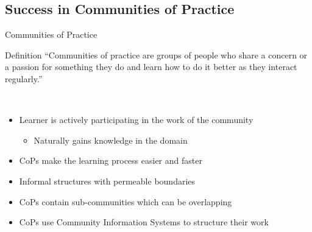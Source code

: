\subsection{Success in Communities of Practice}

\begin{frame}{Communities of Practice}
  \begin{block}{Definition}
    ``Communities of practice are groups of people who share a concern or a
    passion for something they do and learn how to do it better as they interact regularly.'' \cite{Weng98}
  \end{block}
  \ \\
  \begin{itemize}
    \item Learner is actively participating in the work of the community
    \begin{itemize}
        \item Naturally gains knowledge in the domain
    \end{itemize}
    \item CoPs make the learning process easier and faster \cite{CuZe05}
    \item Informal structures with permeable boundaries \cite{RKJa15}
    \item CoPs contain sub-communities which can be overlapping
    \item CoPs use Community Information Systems to structure their work
  \end{itemize}
\end{frame}


